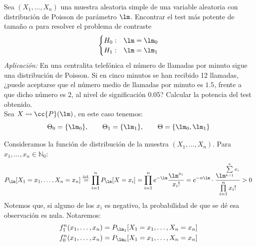 \begin{ejercicio}
    Sea $(X_1, \ldots, X_n)$ una muestra aleatoria simple de una variable aleatoria con distribución de Poisson de parámetro $\lm$. Encontrar el test más potente de tamaño $\alpha$ para resolver el problema de contraste
    \begin{equation*}
        \begin{cases}
            H_0 :& \lm = \lm_0 \\
            H_1 :& \lm = \lm_1
        \end{cases}
    \end{equation*}
    \textit{Aplicación:} En una centralita telefónica el número de llamadas por minuto sigue una distribución de Poisson. Si en cinco minutos se han recibido 12 llamadas, ¿puede aceptarse que el número medio de llamadas por minuto es $1.5$, frente a que dicho número es 2, al nivel de significación $0.05$? Calcular la potencia del test obtenido.\\

    \noindent
    Sea $X\rightsquigarrow \cc{P}(\lm)$, en este caso tenemos:
    \begin{equation*}
        \Theta_0 = \{\lm_0\}, \qquad \Theta_1 = \{\lm_1\}, \qquad \Theta = \{\lm_0,\lm_1\}
    \end{equation*}

    Consideramos la función de distribución de la muestra $(X_1, \ldots, X_n)$. Para $x_1, \ldots, x_n \in \mathbb{N}_0$:
    \begin{equation*}
        P_{\lm}[X_1 = x_1, \ldots, X_n = x_n] \stackrel{\text{iid.}}{=} \prod_{i=1}^{n} P_{\lm}[X=x_i] = \prod_{i=1}^{n} e^{-\lm} \frac{\lm^{x_i}}{x_i!} = e^{-n\lm} \cdot \frac{\lm^{\sum\limits_{k=1}^{n}x_i}}{\prod\limits_{i=1}^{n}x_i!} > 0
    \end{equation*}
    Notemos que, si alguno de los $x_i$ es negativo, la probabilidad de que se dé esa observación es nula. Notaremos:
    \begin{align*}
        f_1^n(x_1, \ldots, x_n) &= P_{\lm_1}[X_1=x_1, \ldots, X_n=x_n]\\
        f_0^n(x_1, \ldots, x_n) &= P_{\lm_0}[X_1=x_1, \ldots, X_n=x_n]
    \end{align*}
    

\end{ejercicio}
